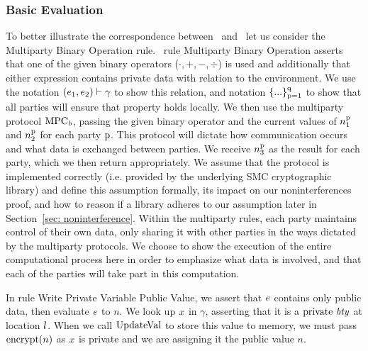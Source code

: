 \subsubsection{Basic Evaluation} \label{subsec: picco basic eval}
To better illustrate the correspondence between \piccoC\  and \vanillaC\  let us consider the Multiparty Binary Operation rule.
\piccoC\ rule Multiparty Binary Operation asserts that one of the given binary operators ($\cdot, +,-,\div$) is used and additionally that either expression contains private data with relation to the environment. 
We use the notation $(e_{1}, e_{2}) \vdash \gamma$ to show this relation, and  
notation $\{...\}^{\mathrm{{q}}}_{\mathrm{{p}} = \mathrm{{1}}}$ to show that all parties will ensure that property holds locally.
We then use the multiparty protocol $\mathrm{MPC}_\mathit{{b}}$, passing the given binary operator and the current values of $n^{\mathrm{{p}}}_1$ and $n^{\mathrm{{p}}}_2$ for each party $\mathrm{{p}}$. 
This protocol will dictate how communication occurs and what data is exchanged between parties. 
We receive $n^{\mathrm{{p}}}_3$ as the result for each party, which we then return appropriately.   We assume that the protocol is implemented correctly (i.e. provided by the underlying SMC cryptographic library) and define this assumption formally, its impact on our noninterferences proof, and how to reason if a library adheres to our assumption later in Section~\ref{sec: noninterference}. 
Within the multiparty rules, each party maintains control of their own data, only sharing it with other parties in the ways dictated by the multiparty protocols. We choose to show the execution of the entire computational process here in order to emphasize what data is involved, and that each of the parties will take part in this computation. 

In rule Write Private Variable Public Value, we assert that $e$ contains only public data,  
then evaluate $e$ to $n$. We look up $x$ in $\gamma$, asserting that it is a $\mathrm{private}\ \mathit{bty}$ at location $l$. 
When we call $\mathrm{UpdateVal}$ to store this value to memory, we must pass $\mathrm{encrypt}(n)$ as $x$ is private and we are assigning it the public value $n$. 


%
%
